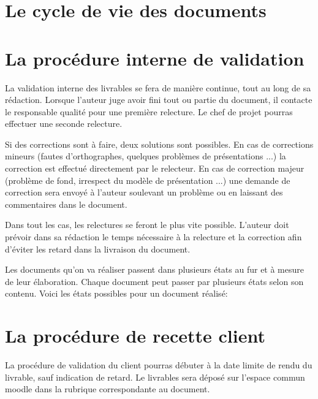 \section{Le cycle de vie des documents}


\section{La procédure interne de validation}

La validation interne des livrables se fera de manière continue, tout au long de sa rédaction.
Lorsque l’auteur juge avoir fini tout ou partie du document, il contacte le responsable qualité pour une première relecture. Le chef de projet pourras effectuer une seconde relecture.

Si des corrections sont à faire, deux solutions sont possibles.
En cas de corrections mineurs (fautes d’orthographes, quelques problèmes de présentations ...) la correction est effectué directement par le relecteur.
En cas de correction majeur (problème de fond, irrespect du modèle de présentation ...) une demande de correction sera envoyé à l’auteur soulevant un problème ou en laissant des commentaires dans le document.

Dans tout les cas, les relectures se feront le plus vite possible.
L’auteur doit prévoir dans sa rédaction le temps nécessaire à la relecture et la correction afin d’éviter les retard dans la livraison du document.

Les documents qu'on va réaliser passent dans plusieurs états au fur et à mesure de leur élaboration. Chaque document peut passer par plusieurs états selon son contenu. Voici les états possibles pour un document réalisé:



\section{La procédure de recette client}

La procédure de validation du client pourras débuter à la date limite de rendu du livrable, sauf indication de retard. Le livrables sera déposé sur l'espace commun moodle dans la rubrique correspondante au document.

